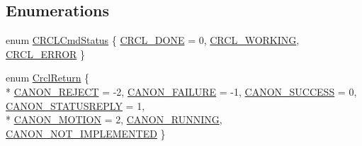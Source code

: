 \subsection*{Enumerations}
\begin{DoxyCompactItemize}
\item 
enum \hyperlink{namespaceCrcl_a5433cc9af1949d6f1305896f70a25eb2}{C\-R\-C\-L\-Cmd\-Status} \{ \hyperlink{namespaceCrcl_a5433cc9af1949d6f1305896f70a25eb2af072d9ec71f5cad174c9d48edc63cfda}{C\-R\-C\-L\-\_\-\-D\-O\-N\-E} = 0, 
\hyperlink{namespaceCrcl_a5433cc9af1949d6f1305896f70a25eb2a7917015bd7568bad9b62b9a544fcc6a7}{C\-R\-C\-L\-\_\-\-W\-O\-R\-K\-I\-N\-G}, 
\hyperlink{namespaceCrcl_a5433cc9af1949d6f1305896f70a25eb2a0e13ed6a4f24390d9e36dacec72abaa8}{C\-R\-C\-L\-\_\-\-E\-R\-R\-O\-R}
 \}
\item 
enum \hyperlink{namespaceCrcl_a1ed3b29723118a020251dde9b12733c0}{Crcl\-Return} \{ \\*
\hyperlink{namespaceCrcl_a1ed3b29723118a020251dde9b12733c0a8ba59e3e99680c229d1c20bc56aaf355}{C\-A\-N\-O\-N\-\_\-\-R\-E\-J\-E\-C\-T} = -\/2, 
\hyperlink{namespaceCrcl_a1ed3b29723118a020251dde9b12733c0abf41e0170807e238ca1716811f0a395e}{C\-A\-N\-O\-N\-\_\-\-F\-A\-I\-L\-U\-R\-E} = -\/1, 
\hyperlink{namespaceCrcl_a1ed3b29723118a020251dde9b12733c0af9001172ed075345641fbb95a818e0da}{C\-A\-N\-O\-N\-\_\-\-S\-U\-C\-C\-E\-S\-S} = 0, 
\hyperlink{namespaceCrcl_a1ed3b29723118a020251dde9b12733c0af8040d4fa18254e17c0e5b1893ba8859}{C\-A\-N\-O\-N\-\_\-\-S\-T\-A\-T\-U\-S\-R\-E\-P\-L\-Y} = 1, 
\\*
\hyperlink{namespaceCrcl_a1ed3b29723118a020251dde9b12733c0a8044ac4052e4558e22c5be516d106204}{C\-A\-N\-O\-N\-\_\-\-M\-O\-T\-I\-O\-N} = 2, 
\hyperlink{namespaceCrcl_a1ed3b29723118a020251dde9b12733c0afdcee8c4e0e747aa30452b835fd1380a}{C\-A\-N\-O\-N\-\_\-\-R\-U\-N\-N\-I\-N\-G}, 
\hyperlink{namespaceCrcl_a1ed3b29723118a020251dde9b12733c0a7e627586bca4ce3863e89ebcd7a55c74}{C\-A\-N\-O\-N\-\_\-\-N\-O\-T\-\_\-\-I\-M\-P\-L\-E\-M\-E\-N\-T\-E\-D}
 \}
\end{DoxyCompactItemize}
